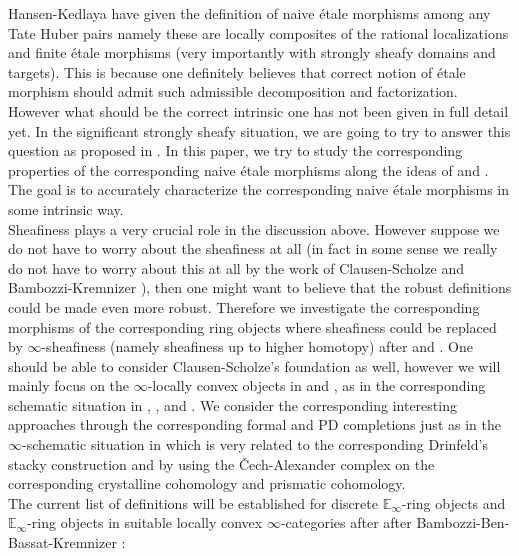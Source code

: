 \documentclass[12pt]{amsart}
\theoremstyle{definition}
\numberwithin{equation}{section}
\begin{document}
\indent Hansen-Kedlaya \cite{HK} have given the definition of naive \'etale morphisms among any Tate Huber pairs namely these are locally composites of the rational localizations and finite \'etale morphisms (very importantly with strongly sheafy domains and targets). This is because one definitely believes that correct notion of \'etale morphism should admit such admissible decomposition and factorization. However what should be the correct intrinsic one has not been given in full detail yet. In the significant strongly sheafy situation, we are going to try to answer this question as proposed in \cite[Appendix 5]{Ked1}. In this paper, we try to study the corresponding properties of the corresponding naive \'etale morphisms along the ideas of \cite[Appendix 5]{Ked1} and \cite{HK}. The goal is to accurately characterize the corresponding naive \'etale morphisms in some intrinsic way.\\


\indent Sheafiness plays a very crucial role in the discussion above. However suppose we do not have to worry about the sheafiness at all (in fact in some sense we really do not have to worry about this at all by the work of Clausen-Scholze \cite{CS} and Bambozzi-Kremnizer \cite{BK}), then one might want to believe that the robust definitions could be made even more robust. Therefore we investigate the corresponding morphisms of the corresponding ring objects where sheafiness could be replaced by $\infty$-sheafiness (namely sheafiness up to higher homotopy) after \cite{BBBK} and \cite{BK}. One should be able to consider Clausen-Scholze's foundation \cite{CS} as well, however we will mainly focus on the $\infty$-locally convex objects in \cite{BBBK} and \cite{BK}, as in the corresponding schematic situation in \cite{Lu1}, \cite{Lu2}, \cite{TV1} and \cite{TV2}. We consider the corresponding interesting approaches through the corresponding formal and PD completions just as in the $\infty$-schematic situation in \cite{R} which is very related to the corresponding Drinfeld's stacky construction \cite{Dr1} and \cite{Dr2} by using the \v{C}ech-Alexander complex on the corresponding crystalline cohomology and prismatic cohomology.\\


\indent The current list of definitions will be established for discrete $\mathbb{E}_\infty$-ring objects and $\mathbb{E}_\infty$-ring objects in suitable locally convex $\infty$-categories after after Bambozzi-Ben-Bassat-Kremnizer \cite{BBBK}:\\
\end{document}
